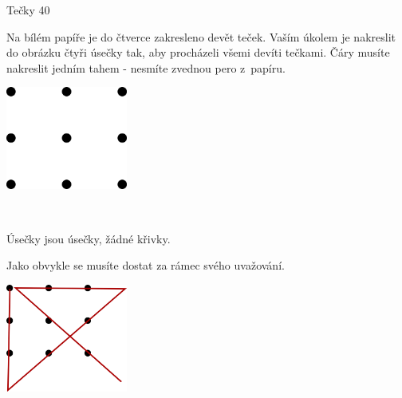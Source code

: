 Tečky
40 %

Na bílém papíře je do čtverce zakresleno devět teček. Vaším úkolem je nakreslit
do obrázku čtyři úsečky tak, aby procházeli všemi devíti tečkami. Čáry musíte
nakreslit jedním tahem - nesmíte zvednou pero z~papíru.

\begin{center}
	\includegraphics[width=0.3\textwidth]{../data/Rychlovky/tecky.png}
\end{center}
~

Úsečky jsou úsečky, žádné křivky.

Jako obvykle se musíte dostat za rámec svého uvažování.

\begin{center}
	\includegraphics[width=0.3\textwidth]{../data/Rychlovky/tecky_reseni.png}
\end{center}
